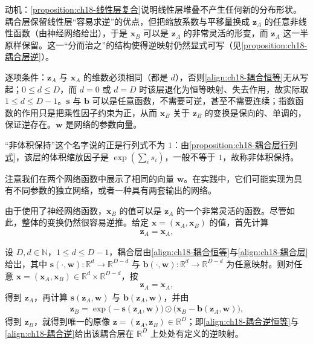 \documentclass[../../main.tex]{subfiles}
\begin{document}
\begin{remark}
动机：\cref{proposition:ch18-线性层复合}说明线性层堆叠不产生任何新的分布形状。耦合层保留线性层“容易求逆”的优点，但把缩放系数与平移量换成 $\bm{z}_A$ 的任意非线性函数（由神经网络给出），于是 $\bm{x}_B$ 可以是 $\bm{z}_A$ 的非常灵活的形变，而 $\bm{z}_A$ 这一半原样保留。这一“分而治之”的结构使得逆映射仍然显式可写（见\cref{proposition:ch18-耦合层逆}）。

逐项条件：$\bm{z}_A$ 与 $\bm{x}_A$ 的维数必须相同（都是 $d$），否则\eqref{align:ch18-耦合恒等}无从写起；$0\leqslant d\leqslant D$，而 $d=0$ 或 $d=D$ 时该层退化为恒等映射、失去作用，故实际取 $1\leqslant d\leqslant D-1$。$\bm{s}$ 与 $\bm{b}$ 可以是任意函数，不需要可逆，甚至不需要连续；指数函数的作用只是把乘性因子约束为正，从而 $\bm{x}_B$ 关于 $\bm{z}_B$ 的变换是保向的、单调的，保证逆存在。$\bm{w}$ 是网络的参数向量。

“非体积保持”这个名字说的正是行列式不为 $1$：由\cref{proposition:ch18-耦合层行列式}，该层的体积缩放因子是 $\exp\left(\sum_i s_i\right)$，一般不等于 $1$，故称非体积保持。
\end{remark}

注意我们在两个网络函数中展示了相同的向量 $\bm{w}$。在实践中，它们可能实现为具有不同参数的独立网络，或者一种具有两套输出的网络。

由于使用了神经网络函数，$\bm{x}_B$ 的值可以是 $\bm{z}_A$ 的一个非常灵活的函数。尽管如此，整体的变换仍然很容易逆推。给定 $\bm{x}=(\bm{x}_A,\bm{x}_B)$ 的值，首先计算
\begin{align}
  \bm{z}_A=\bm{x}_A,\label{align:ch18-耦合逆恒等}
\end{align}

\begin{proposition}[耦合层的逆]\label{proposition:ch18-耦合层逆}
设 $D,d\in\mathbb{N}$，$1\leqslant d\leqslant D-1$，耦合层由\eqref{align:ch18-耦合恒等}与\eqref{align:ch18-耦合层}给出，其中 $\bm{s}(\cdot,\bm{w}):\mathbb{R}^{d}\to\mathbb{R}^{D-d}$ 与 $\bm{b}(\cdot,\bm{w}):\mathbb{R}^{d}\to\mathbb{R}^{D-d}$ 为任意映射。则对任意 $\bm{x}=(\bm{x}_A,\bm{x}_B)\in\mathbb{R}^{d}\times\mathbb{R}^{D-d}$，按
\begin{align}
  \bm{z}_A=\bm{x}_A,
\end{align}
得到 $\bm{z}_A$，再计算 $\bm{s}(\bm{z}_A,\bm{w})$ 与 $\bm{b}(\bm{z}_A,\bm{w})$，并由
\begin{align}
  \bm{z}_B=\exp\big(-\bm{s}(\bm{z}_A,\bm{w})\big)\odot\big(\bm{x}_B-\bm{b}(\bm{z}_A,\bm{w})\big),\label{align:ch18-耦合逆}
\end{align}
得到 $\bm{z}_B$，就得到唯一的原像 $\bm{z}=(\bm{z}_A,\bm{z}_B)\in\mathbb{R}^{D}$；即\eqref{align:ch18-耦合逆恒等}与\eqref{align:ch18-耦合逆}给出该耦合层在 $\mathbb{R}^{D}$ 上处处有定义的逆映射。
\end{proposition}
\end{document}
